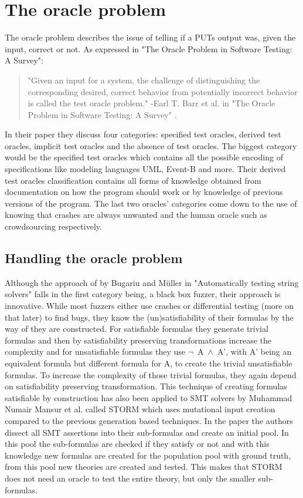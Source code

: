 \section{The oracle problem}
\label{fuzzing:OracleProblem}
The oracle problem describes the issue of telling if a PUTs output was, given the input, correct or not. As expressed in "The Oracle Problem in Software Testing: A Survey": 
\begin{quote}
	"Given an input for a system, the challenge of distinguishing the corresponding desired, correct behavior from potentially incorrect behavior is called the test oracle problem."
	\newline
	-Earl T. Barr et al. in "The Oracle Problem in Software Testing: A Survey" \cite{10barr2014oracleProblem}.
\end{quote}
In their paper they discuss four categories: specified test oracles, derived test oracles, implicit test oracles and the absence of test oracles. The biggest category would be the specified test oracles which contains all the possible encoding of specifications like modeling languages UML, Event-B and more. Their derived test oracles classification contains all forms of knowledge obtained from documentation on how the program should work or by knowledge of previous versions of the program. The last two oracles' categories come down to the use of knowing that crashes are always unwanted and the human oracle such as crowdsourcing respectively.

\subsection{Handling the oracle problem}
\label{fuzzing:handelingOracelproblem}
Although the approach of by Bugariu and M\"uller in "Automatically testing string solvers" \cite{9bugariu2020automaticallyTestingStringSolvers} falls in the first category being, a black box fuzzer, their approach is innovative. While most fuzzers either use crashes or differential testing (more on that later) to find bugs, they know the (un)satisfiability of their formulas by the way of they are constructed. For satisfiable formulas they generate trivial formulas and then by satisfiability preserving transformations increase the complexity and for unsatisfiable formulas they use \mbox{$\neg$ A $\land$ A'}, with A' being an equivalent formula but different formula for A, to create the trivial unsatisfiable formulas. To increase the complexity of those trivial formulas, they again depend on satisfiability preserving transformation. This technique of creating formulas satisfiable by construction has also been applied to SMT solvers by Muhammad Numair Mansur et al. called STORM \cite{1mansur2020detecting} which uses mutational input creation compared to the previous generation based techniques. In the paper the authors dissect all SMT assertions into their sub-formulas and create an initial pool. In this pool the sub-formulas are checked if they satisfy or not and with this knowledge new formulas are created for the population pool with ground truth, from this pool new theories are created and tested. This makes that STORM does not need an oracle to test the entire theory, but only the smaller sub-formulas.



